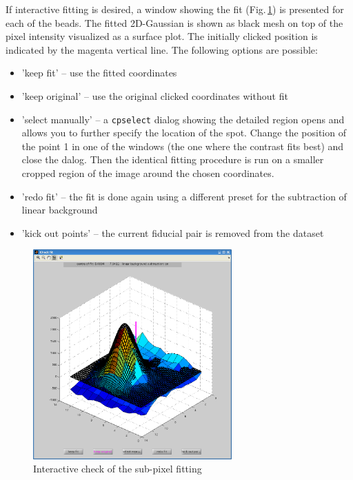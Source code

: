 \documentclass[10pt,a4paper,onepage,DIV12]{scrartcl}
\begin{document}
If interactive fitting is desired, a window showing the fit (Fig.\,\ref{fig:gaussfit_gui}) is presented for each of the beads. The fitted 2D-Gaussian is shown as black mesh on top of the pixel intensity visualized as a surface plot. The initially clicked position is indicated by the magenta vertical line. The following options are possible:
\begin{itemize}
 \item 'keep fit' -- use the fitted coordinates
 \item 'keep original' -- use the original clicked coordinates without fit
 \item 'select manually' -- a \texttt{cpselect} dialog showing the detailed region opens and allows you to further specify the location of the spot. Change the position of the point 1 in one of the windows (the one where the contrast fits best) and close the dalog. Then the identical fitting procedure is run on a smaller cropped region of the image around the chosen coordinates.
 \item 'redo fit' -- the fit is done again using a different preset for the subtraction of linear background
 \item 'kick out points' -- the current fiducial pair is removed from the dataset
\end{itemize}

\begin{figure}[h!]
 \centering
 \includegraphics[width=0.68\textwidth]{images/gaussfit_gui.png}
 \caption{Interactive check of the sub-pixel fitting}
 \label{fig:gaussfit_gui}
\end{figure}
\end{document}
